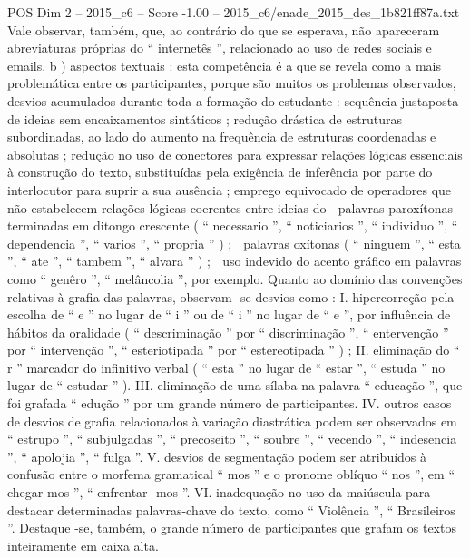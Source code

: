 \begin{textsample}{POS Dim 2 – 2015\_c6 – Score -1.00 – 2015\_c6/enade\_2015\_des\_1b821ff87a.txt}
Vale observar, também, que, ao contrário do que se esperava, não apareceram abreviaturas próprias do “ internetês ”, relacionado ao uso de redes sociais e emails. b ) aspectos textuais : esta competência é a que se revela como a mais problemática entre os participantes, porque são muitos os problemas observados, desvios acumulados durante toda a formação do estudante : sequência justaposta de ideias sem encaixamentos sintáticos ; redução drástica de estruturas subordinadas, ao lado do aumento na frequência de estruturas coordenadas e absolutas ; redução no uso de conectores para expressar relações lógicas essenciais à construção do texto, substituídas pela exigência de inferência por parte do interlocutor para suprir a sua ausência ; emprego equivocado de operadores que não estabelecem relações lógicas coerentes entre ideias do  palavras paroxítonas terminadas em ditongo crescente ( “ necessario ”, “ noticiarios ”, “ individuo ”, “ dependencia ”, “ varios ”, “ propria ” ) ;  palavras oxítonas ( “ ninguem ”, “ esta ”, “ ate ”, “ tambem ”, “ alvara ” ) ;  uso indevido do acento gráfico em palavras como “ genêro ”, “ melâncolia ”, por exemplo.
Quanto ao domínio das convenções relativas à grafia das palavras, observam -se desvios como : I. hipercorreção pela escolha de “ e ” no lugar de “ i ” ou de “ i ” no lugar de “ e ”, por influência de hábitos da oralidade ( “ descriminação ” por “ discriminação ”, “ entervenção ” por “ intervenção ”, “ esteriotipada ” por “ estereotipada ” ) ; II. eliminação do “ r ” marcador do infinitivo verbal ( “ esta ” no lugar de “ estar ”, “ estuda ” no lugar de “ estudar ” ).
III. eliminação de uma sílaba na palavra “ educação ”, que foi grafada “ edução ” por um grande número de participantes.
IV. outros casos de desvios de grafia relacionados à variação diastrática podem ser observados em “ estrupo ”, “ subjulgadas ”, “ precoseito ”, “ soubre ”, “ vecendo ”, “ indesencia ”, “ apolojia ”, “ fulga ”.
V. desvios de segmentação podem ser atribuídos à confusão entre o morfema gramatical “ mos ” e o pronome oblíquo “ nos ”, em “ chegar mos ”, “ enfrentar -mos ”.
VI. inadequação no uso da maiúscula para destacar determinadas palavras-chave do texto, como “ Violência ”, “ Brasileiros ”.
Destaque -se, também, o grande número de participantes que grafam os textos inteiramente em caixa alta.

\end{textsample}
